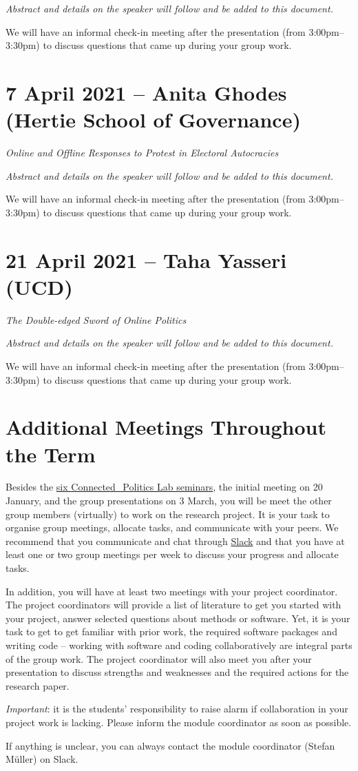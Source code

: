 \documentclass[abstract=on,parskip=full,headings=standardclasses,fontsize=11pt,paper=a4]{scrartcl}
\begin{document}
 \textit{Abstract and details on the speaker will follow and be added to this document.}

 
 We will have an informal check-in meeting after the presentation (from 3:00pm--3:30pm) to discuss questions that came up during your group work.
 
\section{7 April 2021 -- Anita Ghodes (Hertie School of Governance)}

 \textit{Online and Offline Responses to Protest in Electoral Autocracies}

\textit{Abstract and details on the speaker will follow and be added to this document.}


We will have an informal check-in meeting after the presentation (from 3:00pm--3:30pm) to discuss questions that came up during your group work.


\section{21 April 2021 -- Taha Yasseri (UCD)}


 \textit{The Double-edged Sword of Online Politics}

\textit{Abstract and details on the speaker will follow and be added to this document.}


We will have an informal check-in meeting after the presentation (from 3:00pm--3:30pm) to discuss questions that came up during your group work.




\section{Additional Meetings Throughout the Term}

Besides the \href{https://www.ucd.ie/connected_politics/events/}{six Connected\_Politics Lab seminars}, the initial meeting on 20 January, and the group presentations on 3 March, you will be meet the other group members (virtually) to work on  the research project. It is your task to organise group meetings, allocate tasks, and communicate with your peers. We recommend that you communicate and chat through \href{https://ucdconnectedpolitics.slack.com.}{Slack} and that you have at least one or two  group meetings  per week to discuss your progress and allocate  tasks. 


 In addition, you will have at least two meetings with your project coordinator. The project coordinators will provide a list of literature to get you started with your project, answer selected questions about methods or software. Yet, it is your task to get to get familiar with prior work, the required software packages and writing code -- working with software and coding collaboratively are integral parts of the group work. The project coordinator will also meet you after your presentation to discuss strengths and weaknesses and the required actions for the research paper.


\textit{Important}: it is the students' responsibility to raise alarm if collaboration in your project work is lacking. Please inform the module coordinator as soon as possible.


If anything is unclear, you can always contact the module coordinator (Stefan Müller) on  Slack.
\end{document}
